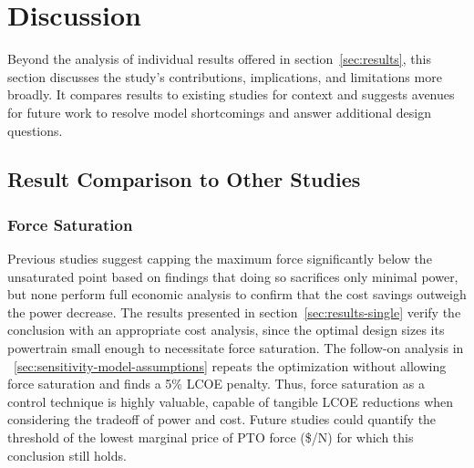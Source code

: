 \section{Discussion}\label{sec:discussion}

Beyond the analysis of individual results offered in section~\ref{sec:results}, this section discusses the study's contributions, implications, and limitations more broadly. It compares results to existing studies for context and suggests avenues for future work to resolve model shortcomings and answer additional design questions.

\subsection{Result Comparison to Other Studies }
\subsubsection{Force Saturation}
Previous studies \cite{mcgilton_optimal_2024,coe_maybe_2021,devin_high-dimensional_2024,gaebele_tpl_2025,mccabe_force-limited_2024} suggest capping the maximum force significantly below the unsaturated point based on findings that doing so sacrifices only minimal power, but none perform full economic analysis to confirm that the cost savings outweigh the power decrease. The results presented in section~\ref{sec:results-single} verify the conclusion with an appropriate cost analysis, since the optimal design sizes its powertrain small enough to necessitate force saturation. The follow-on analysis in \sectionautorefname~\ref{sec:sensitivity-model-assumptions} repeats the optimization without allowing force saturation and finds a 5\% LCOE penalty.  Thus, force saturation as a control technique is highly valuable, capable of tangible LCOE reductions when considering the tradeoff of power and cost. Future studies could quantify the threshold of the lowest marginal price of PTO force (\$/N) for which this conclusion still holds.


